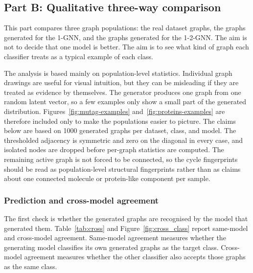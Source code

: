 \documentclass[12pt,a4paper]{article}
\begin{document}
\subsection{Part B: Qualitative three-way comparison}
\label{sec:qualitative}

This part compares three graph populations: the real dataset graphs, the graphs generated for the 1-GNN, and the graphs generated for the 1-2-GNN. The aim is not to decide that one model is better. The aim is to see what kind of graph each classifier treats as a typical example of each class.

The analysis is based mainly on population-level statistics. Individual graph drawings are useful for visual intuition, but they can be misleading if they are treated as evidence by themselves. The generator produces one graph from one random latent vector, so a few examples only show a small part of the generated distribution. Figures~\ref{fig:mutag-examples} and~\ref{fig:proteins-examples} are therefore included only to make the populations easier to picture. The claims below are based on 1000 generated graphs per dataset, class, and model. The thresholded adjacency is symmetric and zero on the diagonal in every case, and isolated nodes are dropped before per-graph statistics are computed. The remaining active graph is not forced to be connected, so the cycle fingerprints should be read as population-level structural fingerprints rather than as claims about one connected molecule or protein-like component per sample.

\subsubsection{Prediction and cross-model agreement}
\label{sec:comparison}

The first check is whether the generated graphs are recognised by the model that generated them. Table~\ref{tab:cross} and Figure~\ref{fig:cross_class} report same-model and cross-model agreement. Same-model agreement measures whether the generating model classifies its own generated graphs as the target class. Cross-model agreement measures whether the other classifier also accepts those graphs as the same class.
\end{document}
